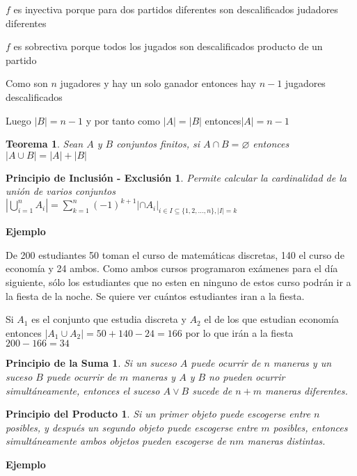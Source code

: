 \documentclass[a4paper,12pt]{report}
\newtheorem*{psm}{Principio de la Suma}
\newtheorem*{ppr}{Principio del Producto}
\newtheorem*{pie}{Principio de Inclusión - Exclusión}
\newtheorem*{teo}{Teorema}
\begin{document}
 $f$ es inyectiva porque para dos partidos diferentes son descalificados judadores diferentes
 
 $f$ es sobrectiva porque todos los jugados son descalificados producto de un partido
 
 Como son $n$ jugadores y hay un solo ganador entonces hay $n-1$ jugadores descalificados
 
 Luego $|B|=n-1$ y por tanto como $|A|=|B|$ entonces$|A|=n-1$

 
\begin{teo}
 Sean $A$ y $B$ conjuntos finitos, si $A\cap B = \varnothing$ entonces \\$|A\cup B|=|A|+|B|$
\end{teo}

\begin{pie}
Permite calcular la cardinalidad de la unión de varios conjuntos\\
 $|\bigcup^n_{i=1}A_i|=\sum^n_{k=1}(-1)^{k+1}|\cap A_i|_{i\in I\subseteq\{1,2,\dots,n\},|I|=k}$
\end{pie}

\textbf{Ejemplo}

De 200 estudiantes 50 toman el curso de matemáticas discretas, 140 el curso de economía y 24 ambos. Como ambos cursos programaron exámenes para el día siguiente, sólo los estudiantes que no esten en ninguno de estos curso podrán ir a la fiesta de la noche. Se quiere ver cuántos estudiantes iran a la fiesta.

Si $A_1$ es el conjunto que estudia discreta y $A_2$ el de los que estudian economía entonces $|A_1\cup A_2|=50+140-24=166$ por lo que irán a la fiesta $200-166=34$
 

\begin{psm}
 Si un suceso $A$ puede ocurrir de $n$ maneras y un suceso $B$ puede ocurrir de $m$ maneras y $A$ y $B$ no pueden ocurrir simultáneamente, entonces el suceso $A\vee B$ sucede de $n + m$ maneras diferentes.
\end{psm}

\begin{ppr}
 Si un primer objeto puede escogerse entre $n$ posibles, y después un segundo objeto puede escogerse entre $m$ posibles, entonces simultáneamente ambos objetos pueden escogerse de
 $nm$ maneras distintas.
\end{ppr}


\textbf{Ejemplo}
\end{document}
